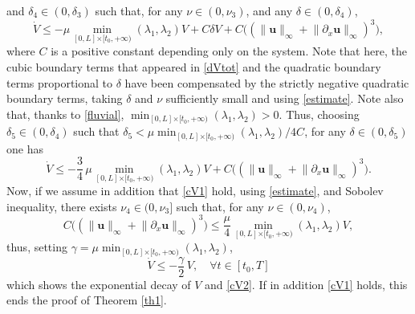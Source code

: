 \documentclass[JEP,XML,SOM,Unicode]{cedram}
\theoremstyle{definition}
\begin{document}
and $\delta_{4}\in(0,\delta_{3})$
such that, for any $\nu\in(0,\nu_{3})$,
and any $\delta\in(0,\delta_{4})$,
\begin{equation*}
\dot V\leq -\mu\min\limits_{[0,L]{\times[t_{0},+\infty)}}(\lambda_{1},\lambda_{2})V+C\delta V +C\bigl(\left(\lVert\boldsymbol{u}\rVert_{\infty}+\lVert\partial_{x}\boldsymbol{u}\rVert_{\infty}\right)^{{3}} \bigr),
\end{equation*}
where $C$ is a positive constant depending only on the system. Note that here, the cubic boundary terms that appeared in \eqref{dVtot} and the quadratic boundary terms proportional to $\delta$ have been compensated by the strictly negative quadratic boundary terms, taking $\delta$ and $\nu$ sufficiently small and using \eqref{estimate}. Note also that, thanks to \eqref{fluvial}, $\min_{[0,L]{\times[t_{0},+\infty)}}(\lambda_{1},\lambda_{2})>0$. Thus, choosing $\delta_{5}\in(0,\delta_{4})$ such that \hbox{$\delta_{5}<\mu\min_{[0,L]{\times[t_{0},+\infty)}}(\lambda_{1},\lambda_{2})/4C$}, for any $\delta\in(0,\delta_{5})$ one has
\begin{equation*}
\dot V\leq -\frac{3}{4}\,\mu\min\limits_{[0,L]{\times[t_{0},+\infty)}}(\lambda_{1},\lambda_{2})V+C \bigl(\left(\lVert\boldsymbol{u}\rVert_{\infty}+\lVert\partial_{x}\boldsymbol{u}\rVert_{\infty}\right)^{{3}} \bigr).
\end{equation*}
Now, if we assume in addition that \eqref{cV1} hold, using \eqref{estimate}, and Sobolev inequality, there exists $\nu_{4}\in(0,\nu_{3}]$ such that, for any $\nu\in(0,\nu_{4})$,
\begin{equation*}
C \bigl(\left(\lVert\boldsymbol{u}\rVert_{\infty}+\lVert\partial_{x}\boldsymbol{u}\rVert_{\infty}\right)^{{3}} \bigr)\leq \frac{\mu}{4}\min\limits_{[0,L]{\times[t_{0},+\infty)}}(\lambda_{1},\lambda_{2})V,
\end{equation*}
thus, setting $\gamma=\mu\min_{[0,L]{\times[t_{0},+\infty)}}(\lambda_{1},\lambda_{2})$,
\begin{equation*}
\dot V\leq -\frac{\gamma}{2}\, V{,\quad\forall t\in[t_{0},T]}
\end{equation*}
which shows the exponential decay of $V$ and \eqref{cV2}. {If in addition \eqref{cV1} holds, this}
ends the proof of Theorem \ref{th1}.
\end{document}
